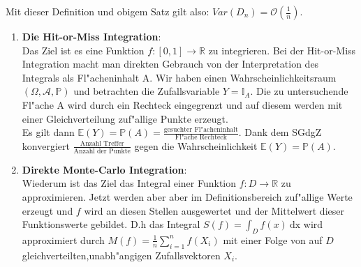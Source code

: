 Mit dieser Definition und obigem Satz gilt also: $Var(D_n)=\mathcal{O}(\frac{1}{n}).$\newpage
\begin{enumerate}
\item \textbf{Die Hit-or-Miss Integration}:\\
Das Ziel ist es eine Funktion $f:[0,1]\rightarrow \mathbb{R}$ zu integrieren.
Bei der Hit-or-Miss Integration macht man direkten Gebrauch von der Interpretation des Integrals als Fl"acheninhalt A.
Wir haben einen Wahrscheinlichkeitsraum $(\Omega,\mathcal{A},\mathbb{P})$ und betrachten die Zufallsvariable $Y=\mathbb{I}_A$.
Die zu untersuchende Fl"ache A wird durch ein Rechteck eingegrenzt und
auf diesem werden mit einer Gleichverteilung zuf"allige Punkte
erzeugt.\\
Es gilt dann $\mathbb{E}(Y ) = \mathbb{P}(A) =\frac{ \text{gesuchter Fl"acheninhalt}}{\text{Fl"ache Rechteck}}$.
Dank dem SGdgZ konvergiert $\frac{\text{Anzahl Treffer}}{\text{Anzahl der Punkte}}$ gegen die Wahrscheinlichkeit $\mathbb{E}(Y)=\mathbb{P}(A)$.
\item \textbf{Direkte Monte-Carlo Integration}:\\
Wiederum ist das Ziel das Integral einer Funktion $f:D\rightarrow \mathbb{R}$ zu approximieren.
Jetzt werden aber aber im Definitionsbereich zuf"allige Werte erzeugt und $f$ wird an diesen Stellen ausgewertet und der Mittelwert dieser Funktionswerte gebildet.
D.h das Integral $S(f) = \int_D f(x) \ \text{dx}$ wird approximiert durch $ M(f) =\frac{1}{n}\sum_{i=1}^n f(X_i)$
mit einer Folge von auf $D$ gleichverteilten,unabh"angigen
Zufallsvektoren $X_i$.
\end{enumerate}

